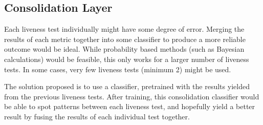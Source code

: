\documentclass[10pt,a4paper]{article}
\begin{document}
    \subsection{Consolidation Layer}
        Each liveness test individually might have some degree of error. Merging the results of each metric together into some classifier to produce a more reliable outcome would be ideal.
        While probability based methods (such as Bayesian calculations) would be feasible, this only works for a larger number of liveness tests. In some cases, very few liveness tests (minimum 2)
        might be used. 

        The solution proposed is to use a classifier, pretrained with the results yielded from the previous liveness tests. After training, this consolidation classifier would be able to spot patterns
        between each liveness test, and hopefully yield a better result by fusing the results of each individual test together. 



  
\end{document}
